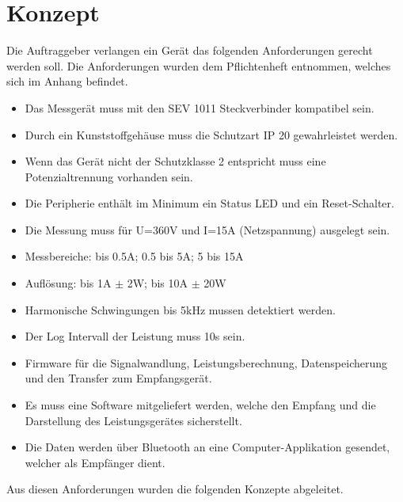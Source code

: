 \section{Konzept}
Die Auftraggeber verlangen ein Gerät das folgenden Anforderungen gerecht werden soll. Die Anforderungen wurden dem Pflichtenheft entnommen, welches sich im Anhang befindet.
\begin{itemize}
\item Das Messgerät muss mit den SEV 1011 Steckverbinder kompatibel sein.
\item Durch ein Kunststoffgehäuse muss die Schutzart IP 20 gewahrleistet werden.
\item Wenn das Gerät nicht der Schutzklasse 2 entspricht muss eine  Potenzialtrennung vorhanden sein.
\item Die Peripherie enthält im Minimum ein Status LED und ein Reset-Schalter.
\item Die Messung muss für U=360V und I=15A (Netzspannung) ausgelegt sein.
\item Messbereiche: bis 0.5A; 0.5 bis 5A; 5 bis 15A
\item Auflösung: bis 1A $\pm$ 2W; bis 10A $\pm$ 20W
\item Harmonische Schwingungen bis 5kHz mussen detektiert werden.
\item Der Log Intervall der Leistung muss 10s sein.
\item Firmware für die Signalwandlung, Leistungsberechnung, Datenspeicherung und den Transfer zum Empfangsgerät.
\item Es muss eine Software mitgeliefert werden, welche den Empfang und die Darstellung des Leistungsgerätes sicherstellt.
\item Die Daten werden über Bluetooth an eine Computer-Applikation gesendet, welcher als Empfänger dient.
\end{itemize}
Aus diesen Anforderungen wurden die folgenden Konzepte abgeleitet.

